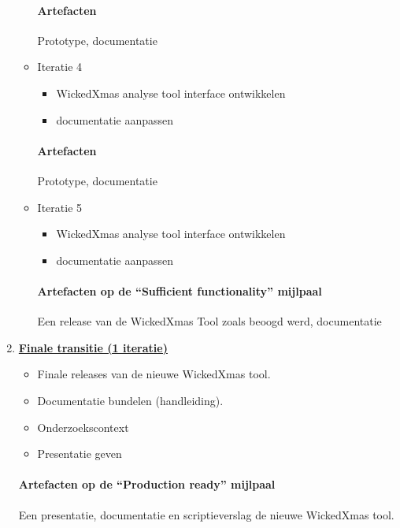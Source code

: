 \begin{enumerate}
\begin{itemize}
		\paragraph{Artefacten}
		Prototype, documentatie
	\item Iteratie 4
		\begin{itemize}
		\item WickedXmas analyse tool interface ontwikkelen
		\item documentatie aanpassen
		\end{itemize}
		\paragraph{Artefacten}
		Prototype, documentatie
	\item Iteratie 5
		\begin{itemize}
		\item WickedXmas analyse tool interface ontwikkelen
		\item documentatie aanpassen
		\end{itemize}
		\paragraph{Artefacten op de ``Sufficient functionality'' mijlpaal }
		 Een release van de WickedXmas Tool zoals beoogd werd,  documentatie
	\end{itemize}
\item \underline{\textbf{Finale transitie (1 iteratie)}}
	\begin{itemize}
		\item Finale releases van de nieuwe WickedXmas tool.
		\item Documentatie bundelen (handleiding).
		\item Onderzoekscontext
		\item Presentatie geven
	\end{itemize}
	\paragraph{Artefacten op de ``Production ready'' mijlpaal}
	Een presentatie, documentatie en scriptieverslag de nieuwe WickedXmas tool.

\end{enumerate}